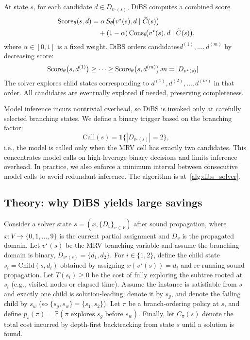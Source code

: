 \documentclass[lettersize,journal]{IEEEtran}
\begin{document}
At state $s$, for each candidate $d\in D_{v^\star(s)}$, DiBS computes a combined score
\begin{align}
\mathrm{Score}_\theta(s,d)
&= \alpha\, S_\theta\!\big(v^\star(s),d \mid \widetilde{C}(s)\big) \notag \\
&\quad + (1-\alpha)\,\mathrm{Cons}_\theta\!\big(v^\star(s),d \mid \widetilde{C}(s)\big),
\label{eq:final_score}
\end{align}
where $\alpha\in[0,1]$ is a fixed weight.
DiBS orders candidates$d^{(1)},\dots,d^{(m)}$ by decreasing score:
\begin{align}
\mathrm{Score}_\theta\big(s,d^{(1)}\big) \notag
&\ge \cdots \ge \mathrm{Score}_\theta\big(s,d^{(m)}\big). m=|D_{v^\star(s)}|
\label{eq:order_rule}
\end{align}
The solver explores child states corresponding to $d^{(1)},d^{(2)},\dots,d^{(m)}$ in that order. All candidates are eventually explored if needed, preserving completeness.

Model inference incurs nontrivial overhead, so DiBS is invoked only at carefully selected branching states.
We define a binary trigger based on the branching factor:
\begin{equation}
	\mathrm{Call}(s)=\mathbf{1}\{|D_{v^\star(s)}| = 2\},
	\label{eq:trigger}
\end{equation}
i.e., the model is called only when the MRV cell has exactly two candidates.
This concentrates model calls on high-leverage binary decisions and limits inference overhead.
In practice, we also enforce a minimum interval between consecutive model calls to avoid redundant inference. The algorithm is at~\ref{alg:dibs_solver}.


\subsection{Theory: why DiBS yields large savings}
Consider a solver state $s=(x,\{D_v\}_{v\in V})$ after sound propagation, where
$x:V\to\{0,1,\dots,9\}$ is the current partial assignment and $D_v$ is the propagated domain.
Let $v^\star(s)$ be the MRV branching variable and assume the branching domain is binary,
$D_{v^\star(s)}=\{d_1,d_2\}$.
For $i\in\{1,2\}$, define the child state $s_i=\mathrm{Child}(s,d_i)$ obtained by assigning
$x(v^\star(s))=d_i$ and re-running sound propagation.
Let $T(s_i)\ge 0$ be the cost of fully exploring the subtree rooted at $s_i$
(e.g., visited nodes or elapsed time).
Assume the instance is satisfiable from $s$ and exactly one child is solution-leading; denote it by $s_g$,
and denote the failing child by $s_w$ (so $\{s_g,s_w\}=\{s_1,s_2\}$).
Let $\pi$ be a branch-ordering policy at $s$, and define
$p_s(\pi)=\mathbb{P}(\pi \text{ explores } s_g \text{ before } s_w)$.
Finally, let $C_\pi(s)$ denote the total cost incurred by depth-first backtracking from state $s$
until a solution is found.
\end{document}
